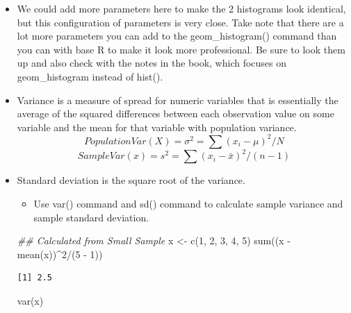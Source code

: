 \documentclass[
  letterpaper,
  DIV=11,
  numbers=noendperiod]{scrreprt}
\newenvironment{Shaded}{\begin{snugshade}}{\end{snugshade}}
\newcommand{\DecValTok}[1]{\textcolor[rgb]{0.68,0.00,0.00}{#1}}
\newcommand{\DocumentationTok}[1]{\textcolor[rgb]{0.37,0.37,0.37}{\textit{#1}}}
\newcommand{\FunctionTok}[1]{\textcolor[rgb]{0.28,0.35,0.67}{#1}}
\newcommand{\NormalTok}[1]{\textcolor[rgb]{0.00,0.23,0.31}{#1}}
\newcommand{\OtherTok}[1]{\textcolor[rgb]{0.00,0.23,0.31}{#1}}
\newcommand{\SpecialCharTok}[1]{\textcolor[rgb]{0.37,0.37,0.37}{#1}}
\providecommand{\tightlist}{%
  \setlength{\itemsep}{0pt}\setlength{\parskip}{0pt}}\usepackage{longtable,booktabs,array}
\begin{document}
\begin{itemize}
\item
  We could add more parameters here to make the 2 histograms look
  identical, but this configuration of parameters is very close. Take
  note that there are a lot more parameters you can add to the
  geom\_histogram() command than you can with base R to make it look
  more professional. Be sure to look them up and also check with the
  notes in the book, which focuses on geom\_histogram instead of hist().
\item
  Variance is a measure of spread for numeric variables that is
  essentially the average of the squared differences between each
  observation value on some variable and the mean for that variable with
  population variance.
  \[Population Var(X) = \sigma^2 = \sum{(x_i-\mu)^2}/N\]
  \[Sample Var(x) = s^2 = \sum{(x_i-\bar{x})^2}/(n-1)\]
\item
  Standard deviation is the square root of the variance.

  \begin{itemize}
  \tightlist
  \item
    Use var() command and sd() command to calculate sample variance and
    sample standard deviation.\\
  \end{itemize}

\begin{Shaded}
\begin{Highlighting}[]
\DocumentationTok{\#\# Calculated from Small Sample}
\NormalTok{x }\OtherTok{\textless{}{-}} \FunctionTok{c}\NormalTok{(}\DecValTok{1}\NormalTok{, }\DecValTok{2}\NormalTok{, }\DecValTok{3}\NormalTok{, }\DecValTok{4}\NormalTok{, }\DecValTok{5}\NormalTok{)}
\FunctionTok{sum}\NormalTok{((x }\SpecialCharTok{{-}} \FunctionTok{mean}\NormalTok{(x))}\SpecialCharTok{\^{}}\DecValTok{2}\SpecialCharTok{/}\NormalTok{(}\DecValTok{5} \SpecialCharTok{{-}} \DecValTok{1}\NormalTok{))}
\end{Highlighting}
\end{Shaded}

\begin{verbatim}
[1] 2.5
\end{verbatim}

\begin{Shaded}
\begin{Highlighting}[]
\FunctionTok{var}\NormalTok{(x)}
\end{Highlighting}
\end{Shaded}


\end{itemize}
\end{document}
